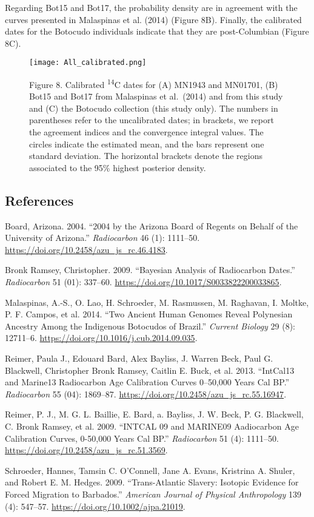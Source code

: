 \documentclass[]{article}
\begin{document}
Regarding Bot15 and Bot17, the probability density are in agreement with
the curves presented in Malaspinas et al. (2014) (Figure 8B). Finally,
the calibrated dates for the Botocudo individuals indicate that they are
post-Columbian (Figure 8C).

\begin{figure}
\centering
\texttt{[image: All\_calibrated.png]}
\caption{Figure 8. Calibrated \textsuperscript{14}C dates for (A) MN1943
and MN01701, (B) Bot15 and Bot17 from Malaspinas et al.~(2014) and from
this study and (C) the Botocudo collection (this study only). The
numbers in parentheses refer to the uncalibrated dates; in brackets, we
report the agreement indices and the convergence integral values. The
circles indicate the estimated mean, and the bars represent one standard
deviation. The horizontal brackets denote the regions associated to the
95\% highest posterior density.}
\end{figure}

\hypertarget{references}{%
\subsection*{References}\label{references}}

\hypertarget{refs}{}
\leavevmode\hypertarget{ref-Board2004}{}%
Board, Arizona. 2004. ``2004 by the Arizona Board of Regents on Behalf
of the University of Arizona.'' \emph{Radiocarbon} 46 (1): 1111--50.
\url{https://doi.org/10.2458/azu_js_rc.46.4183}.

\leavevmode\hypertarget{ref-BronkRamsey2009}{}%
Bronk Ramsey, Christopher. 2009. ``Bayesian Analysis of Radiocarbon
Dates.'' \emph{Radiocarbon} 51 (01): 337--60.
\url{https://doi.org/10.1017/S0033822200033865}.

\leavevmode\hypertarget{ref-Malaspinas2014a}{}%
Malaspinas, A.-S., O. Lao, H. Schroeder, M. Rasmussen, M. Raghavan, I.
Moltke, P. F. Campos, et al. 2014. ``Two Ancient Human Genomes Reveal
Polynesian Ancestry Among the Indigenous Botocudos of Brazil.''
\emph{Current Biology} 29 (8): 12711--6.
\url{https://doi.org/10.1016/j.cub.2014.09.035}.

\leavevmode\hypertarget{ref-Reimer2013}{}%
Reimer, Paula J., Edouard Bard, Alex Bayliss, J. Warren Beck, Paul G.
Blackwell, Christopher Bronk Ramsey, Caitlin E. Buck, et al. 2013.
``IntCal13 and Marine13 Radiocarbon Age Calibration Curves 0--50,000
Years Cal BP.'' \emph{Radiocarbon} 55 (04): 1869--87.
\url{https://doi.org/10.2458/azu_js_rc.55.16947}.

\leavevmode\hypertarget{ref-Reimer2009}{}%
Reimer, P. J., M. G. L. Baillie, E. Bard, a. Bayliss, J. W. Beck, P. G.
Blackwell, C. Bronk Ramsey, et al. 2009. ``INTCAL 09 and MARINE09
Aadiocarbon Age Calibration Curves, 0-50,000 Years Cal BP.''
\emph{Radiocarbon} 51 (4): 1111--50.
\url{https://doi.org/10.2458/azu_js_rc.51.3569}.

\leavevmode\hypertarget{ref-Schroeder2009}{}%
Schroeder, Hannes, Tamsin C. O'Connell, Jane A. Evans, Kristrina A.
Shuler, and Robert E. M. Hedges. 2009. ``Trans-Atlantic Slavery:
Isotopic Evidence for Forced Migration to Barbados.'' \emph{American
Journal of Physical Anthropology} 139 (4): 547--57.
\url{https://doi.org/10.1002/ajpa.21019}.
\end{document}
